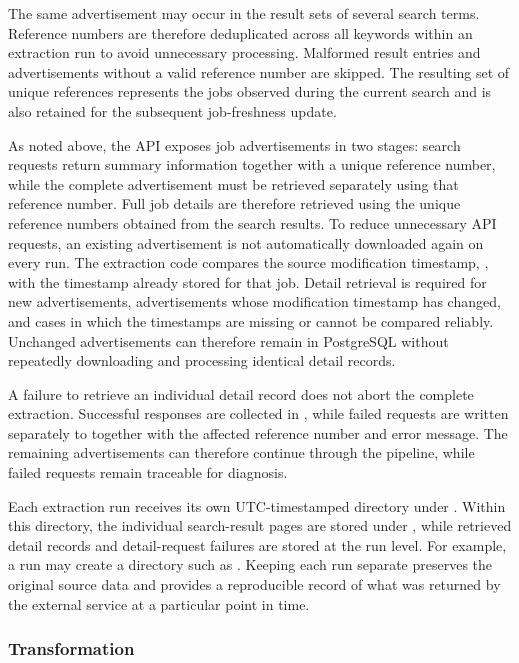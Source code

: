 \documentclass[11pt,a4paper]{article}
\begin{document}
The same advertisement may occur in the result sets of several search terms. Reference numbers are therefore deduplicated across all keywords within an extraction run to avoid unnecessary processing. Malformed result entries and advertisements without a valid reference number are skipped. The resulting set of unique references represents the jobs observed during the current search and is also retained for the subsequent job-freshness update.

As noted above, the API exposes job advertisements in two stages: search requests return summary information together with a unique reference number, while the complete advertisement must be retrieved separately using that reference number. Full job details are therefore retrieved using the unique reference numbers obtained from the search results. To reduce unnecessary API requests, an existing advertisement is not automatically downloaded again on every run. The extraction code compares the source modification timestamp, , with the timestamp already stored for that job. Detail retrieval is required for new advertisements, advertisements whose modification timestamp has changed, and cases in which the timestamps are missing or cannot be compared reliably. Unchanged advertisements can therefore remain in PostgreSQL without repeatedly downloading and processing identical detail records.

A failure to retrieve an individual detail record does not abort the complete extraction. Successful responses are collected in , while failed requests are written separately to  together with the affected reference number and error message. The remaining advertisements can therefore continue through the pipeline, while failed requests remain traceable for diagnosis.

Each extraction run receives its own UTC-timestamped directory under . Within this directory, the individual search-result pages are stored under , while retrieved detail records and detail-request failures are stored at the run level. For example, a run may create a directory such as . Keeping each run separate preserves the original source data and provides a reproducible record of what was returned by the external service at a particular point in time.


\subsubsection{Transformation}
\end{document}
